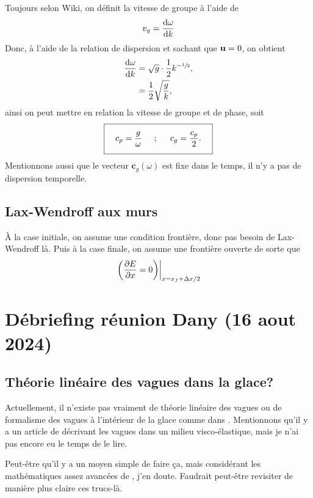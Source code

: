 \documentclass[10pt]{article}
\numberwithin{equation}{section}
\newcommand{\uu}{\vb{u}}
\newcommand{\venti}{\vphantom{\sum_x^x}}
\begin{document}
Toujours selon Wiki, on définit la vitesse de groupe à l'aide de
\begin{equation}
   v_g = \dv{\omega}{k}
\end{equation}
Donc, à l'aide de la relation de dispersion et sachant que \(\uu = 0\), on obtient
\begin{align}
   \dv{\omega}{k} &= \sqrt{g} \cdot \frac{1}{2} k^{-\sfrac{1}{2}},\nonumber\\
     &= \frac{1}{2}\sqrt{\frac{g}{k}},\nonumber\\
\end{align}
ainsi on peut mettre en relation la vitesse de groupe et de phase, soit
\begin{equation}
   \boxed{\quad c_p = \venti\frac{g}{\omega}\hspace{0.5cm};\hspace{0.5cm} c_g = \frac{c_p}{2}.\quad}
\end{equation}
Mentionnons aussi que le vecteur \(\mathbf{c}_g(\omega)\) est fixe dans le temps, il n'y a pas de dispersion temporelle. 
\subsection{Lax-Wendroff aux murs}
\label{sec:orgf7fc3df}
À la case initiale, on assume une condition frontière, donc pas besoin de Lax-Wendroff là.
Puis à la case finale, on assume une frontière ouverte de sorte que
\begin{equation}
   \eval{\qty(\pdv{E}{x} = 0)}_{x = x_f + \Delta x/2}
\end{equation}
\section{Débriefing réunion Dany (16 aout 2024)}
\label{sec:org5140feb}

\subsection{Théorie linéaire des vagues dans la glace?}
\label{sec:org8e7544a}
Actuellement, il n'existe pas vraiment de théorie linéaire des vagues ou de formalisme des vagues à l'intérieur de la glace comme dans \Textcite{miles1957generation}.
Mentionnons qu'il y a un article de \Textcite{miles1996surface} décrivant les vagues dans un milieu visco-élastique, mais je n'ai pas encore eu le temps de le lire.\bigskip

Peut-être qu'il y a un moyen simple de faire ça, mais considérant les mathématiques assez avancées de \Textcite{miles1957generation}, j'en doute.
Faudrait peut-être revisiter de manière plus claire ces trucs-là.
\end{document}
